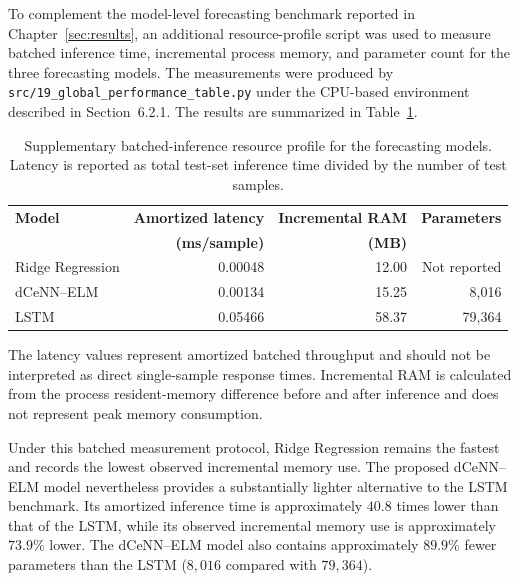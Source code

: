 To complement the model-level forecasting benchmark reported in
Chapter~\ref{sec:results}, an additional resource-profile script was used to
measure batched inference time, incremental process memory, and parameter count
for the three forecasting models. The measurements were produced by
\texttt{src/19\_global\_performance\_table.py} under the CPU-based environment
described in Section~6.2.1. The results are summarized in
Table~\ref{tab:supplementary_resource_profile}.

\begin{table}[H]
	\centering
	\caption{Supplementary batched-inference resource profile for the forecasting
		models. Latency is reported as total test-set inference time divided by the
		number of test samples.}
	\label{tab:supplementary_resource_profile}
	\begin{tabular}{lrrr}
		\hline
		\textbf{Model}
		& \textbf{Amortized latency}
		& \textbf{Incremental RAM}
		& \textbf{Parameters} \\
		& \textbf{(ms/sample)}
		& \textbf{(MB)}
		& \\
		\hline
		Ridge Regression
		& 0.00048
		& 12.00
		& Not reported \\
		
		dCeNN--ELM
		& 0.00134
		& 15.25
		& 8,016 \\
		
		LSTM
		& 0.05466
		& 58.37
		& 79,364 \\
		\hline
	\end{tabular}
	
	\vspace{1mm}
	\begin{minipage}{0.94\linewidth}
		\footnotesize
		The latency values represent amortized batched throughput and should not
		be interpreted as direct single-sample response times. Incremental RAM is
		calculated from the process resident-memory difference before and after
		inference and does not represent peak memory consumption.
	\end{minipage}
\end{table}

Under this batched measurement protocol, Ridge Regression remains the fastest
and records the lowest observed incremental memory use. The proposed
dCeNN--ELM model nevertheless provides a substantially lighter alternative to
the LSTM benchmark. Its amortized inference time is approximately
$40.8$ times lower than that of the LSTM, while its observed incremental memory
use is approximately $73.9\%$ lower. The dCeNN--ELM model also contains
approximately $89.9\%$ fewer parameters than the LSTM
($8{,}016$ compared with $79{,}364$).

